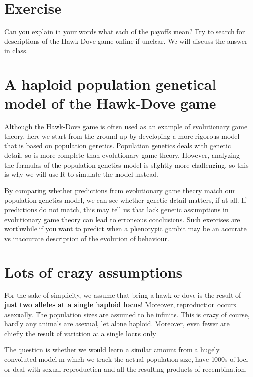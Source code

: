 \documentclass[
]{book}
\begin{document}
\hypertarget{exercise-1}{%
\section{Exercise}\label{exercise-1}}

Can you explain in your words what each of the payoffs mean? Try to search for descriptions of the Hawk Dove game online if unclear. We will discuss the answer in class.

\hypertarget{a-haploid-population-genetical-model-of-the-hawk-dove-game}{%
\section{A haploid population genetical model of the Hawk-Dove game}\label{a-haploid-population-genetical-model-of-the-hawk-dove-game}}

Although the Hawk-Dove game is often used as an example of evolutionary game theory, here we start from the ground up by developing a more rigorous model that is based on population genetics. Population genetics deals with genetic detail, so is more complete than evolutionary game theory. However, analyzing the formulas of the population genetics model is slightly more challenging, so this is why we will use R to simulate the model instead.

By comparing whether predictions from evolutionary game theory match our population genetics model, we can see whether genetic detail matters, if at all. If predictions do not match, this may tell us that lack genetic assumptions in evolutionary game theory can lead to erroneous conclusions. Such exercises are worthwhile if you want to predict when a phenotypic gambit may be an accurate vs inaccurate description of the evolution of behaviour.

\hypertarget{lots-of-crazy-assumptions}{%
\section{Lots of crazy assumptions}\label{lots-of-crazy-assumptions}}

For the sake of simplicity, we assume that being a hawk or dove is the result
of \textbf{just two alleles at a single haploid locus}! Moreover, reproduction occurs asexually. The population sizes are assumed to be infinite.
This is crazy of course, hardly any animals are asexual, let alone haploid. Moreover, even
fewer are chiefly the result of variation at a single locus only.

The question is whether we would learn a similar amount from a hugely convoluted model in which we track the actual population size, have 1000s of loci or deal with sexual reproduction and all the resulting products of recombination.
\end{document}
